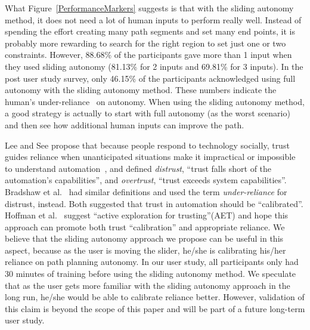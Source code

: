 What Figure~\ref{PerformanceMarkers} suggests is that with the sliding autonomy method, it does not need a lot of human inputs to perform really well. Instead of spending the effort creating many path segments and set many end points, it is probably more rewarding to search for the right region to set just one or two constraints. However, 88.68\% of the participants gave more than 1 input when they used sliding autonomy (81.13\% for 2 inputs and 69.81\% for 3 inputs). In the post user study survey, only 46.15\% of the participants acknowledged using full autonomy with the sliding autonomy method. These numbers indicate the human's under-reliance~\cite{Bradshaw2013Seven} on autonomy. When using the sliding autonomy method, a good strategy is actually to start with full autonomy (as the worst scenario) and then see how additional human inputs can improve the path.


Lee and See propose that because people respond to technology socially, trust guides reliance when unanticipated situations make it impractical or impossible to understand automation~\cite{Lee2004Trust}, and defined \textit{distrust}, ``trust falls short of the automation's capabilities'', and \textit{overtrust}, ``trust exceeds system capabilities''. Bradshaw et al.\ \cite{Bradshaw2013Seven} had similar definitions and used the term \textit{under-reliance} for distrust, instead. Both suggested that trust in automation should be ``calibrated''. Hoffman et al.\ \cite{Hoffman2013Trust} suggest ``active exploration for trusting''(AET) and hope this approach can promote both trust ``calibration'' and appropriate reliance. We believe that the sliding autonomy approach we propose can be useful in this aspect, because as the user is moving the slider, he/she is calibrating his/her reliance on path planning autonomy. In our user study, all participants only had 30 minutes of training before using the sliding autonomy method. We speculate that as the user gets more familiar with the sliding autonomy approach in the long run, he/she would be able to calibrate reliance better. However, validation of this claim is beyond the scope of this paper and will be part of a future long-term user study.

